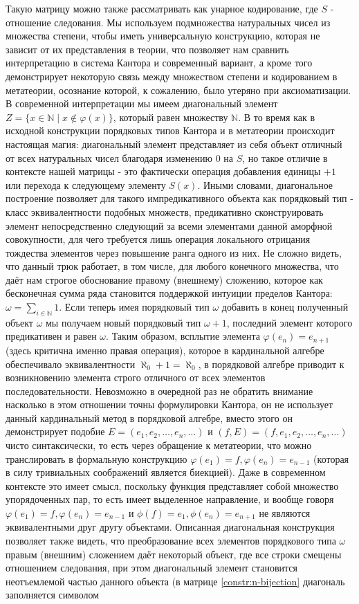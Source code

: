\documentclass[12pt]{article}
\begin{document}
Такую матрицу можно также рассматривать как унарное кодирование, где $S$ - отношение следования. Мы используем подмножества натуральных чисел из множества степени, чтобы иметь универсальную конструкцию, которая не зависит от их представления в теории, что позволяет нам сравнить интерпретацию в система Кантора и современный вариант, а кроме того демонстрирует некоторую связь между множеством степени и кодированием в метатеории, осознание которой, к сожалению, было утеряно при аксиоматизации. В современной интерпретации мы имеем диагональный элемент $Z = \{ x \in \mathbb{N} \mid x \notin \varphi(x) \}$, который равен множеству $\mathbb{N}$. В то время как в исходной конструкции порядковых типов Кантора и в метатеории происходит настоящая магия: диагональный элемент представляет из себя объект отличный от всех натуральных чисел благодаря изменению $0$ на $S$, но такое отличие в контексте нашей матрицы - это фактически операция добавления единицы $+1$ или перехода к следующему элементу $S(x)$. Иными словами, диагональное построение позволяет для такого импредикативного объекта как порядковый тип - класс эквивалентности подобных множеств, предикативно сконструировать элемент непосредственно следующий за всеми элементами данной аморфной совокупности, для чего требуется лишь операция локального отрицания тождества элементов через повышение ранга одного из них. Не сложно видеть, что данный трюк работает, в том числе, для любого конечного множества, что даёт нам строгое обоснование правому (внешнему) сложению, которое как бесконечная сумма ряда становится поддержкой интуиции пределов Кантора: $\omega = \sum\limits_{i \in \mathbb{N}} 1$. Если теперь имея порядковый тип $\omega$ добавить в конец полученный объект $\omega$ мы получаем новый порядковый тип $\omega + 1$, последний элемент которого предикативен и равен $\omega$. Таким образом, всплытие элемента $\varphi(e_{n}) = e_{n + 1}$ (здесь критична именно правая операция), которое в кардинальной алгебре обеспечивало эквивалентности $\aleph_0 + 1 = \aleph_0$, в порядковой алгебре приводит к возникновению элемента строго отличного от всех элементов последовательности. Невозможно в очередной раз не обратить внимание насколько в этом отношении точны формулировки Кантора, он не использует данный кардинальный метод в порядковой алгебре, вместо этого он демонстрирует подобие $E = (e_1, e_2, \dots, e_n, \dots)$ и $(f, E) = (f, e_1, e_2, \dots, e_n, \dots)$ чисто синтаксически, то есть через обращение к метатеории, что можно транслировать в формальную конструкцию $\varphi(e_1) = f, \varphi(e_n) = e_{n - 1}$ \cite{cantor-inner-addition} (которая в силу тривиальных соображений является биекцией). Даже в современном контексте это имеет смысл, поскольку функция представляет собой множество упорядоченных пар, то есть имеет выделенное направление, и вообще говоря $\varphi(e_1) = f, \varphi(e_n) = e_{n - 1}$ и $\phi(f) = e_1, \phi(e_n) = e_{n + 1}$ не являются эквивалентными друг другу объектами. Описанная диагональная конструкция позволяет также видеть, что преобразование всех элементов порядкового типа $\omega$ правым (внешним) сложением даёт некоторый объект, где все строки смещены отношением следования, при этом диагональный элемент становится неотъемлемой частью данного объекта (в матрице \ref{constr:n-bijection} диагональ заполняется символом 
\end{document}
